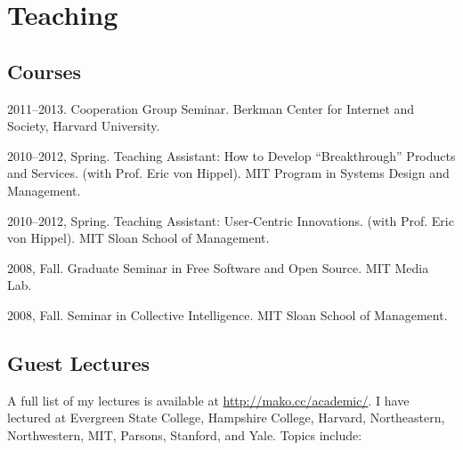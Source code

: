 \documentclass[10pt]{article}
\newenvironment{cvlist}{
\begin{list}{}{\leftmargin=3.0em \itemindent=-3.0em}
  \setlength{\itemsep}{0pt}
  \setlength{\parskip}{0em}
  \setlength{\parsep}{1em}
  \setlength{\parindent}{0em}}
{\vspace{1em}
\end{list}}
\begin{document}
\newpage
\section{Teaching}

\subsection{Courses}
\begin{cvlist}
\item 2011--2013. Cooperation Group Seminar. Berkman Center for Internet and Society, Harvard University.
\item 2010--2012, Spring. Teaching Assistant: How to Develop ``Breakthrough'' Products and Services. (with Prof. Eric von Hippel). MIT Program in Systems Design and Management.
\item 2010--2012, Spring. Teaching Assistant: User-Centric Innovations. (with Prof. Eric von Hippel). MIT Sloan School of Management.
\item 2008, Fall. Graduate Seminar in Free Software and Open Source. MIT Media Lab.
\item 2008, Fall. Seminar in Collective Intelligence. MIT Sloan School of Management.
\end{cvlist}

\subsection{Guest Lectures}

A full list of my lectures is available at \url{http://mako.cc/academic/}. I have lectured at Evergreen State College, Hampshire College, Harvard, Northeastern, Northwestern, MIT, Parsons, Stanford, and Yale. Topics include:
\end{document}

